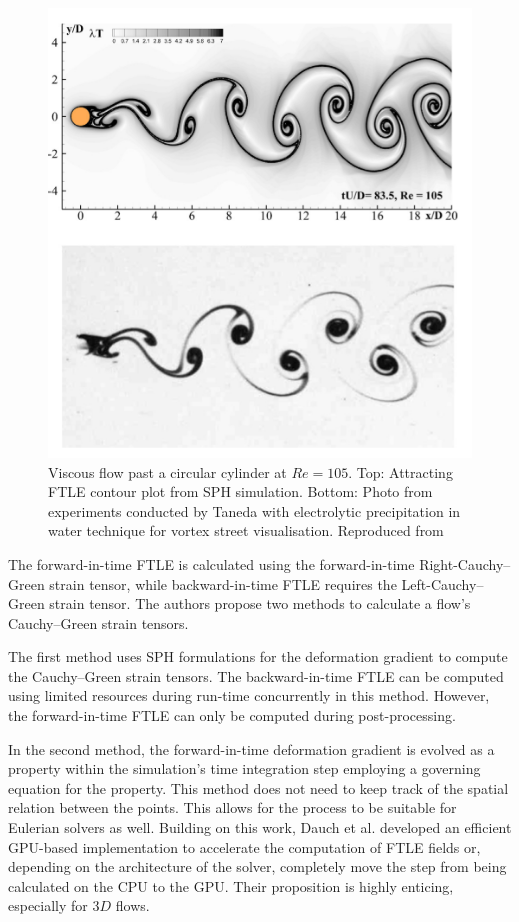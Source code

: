 \begin{figure}[h!]
    \centering
    \includegraphics{Figures/research_papers/sun2016detection-fig-1.png}
    \caption{Viscous flow past a circular cylinder at $Re = 105$. Top: Attracting FTLE contour plot from SPH simulation. Bottom: Photo from experiments conducted by Taneda \parencite{taneda1977visual} with electrolytic precipitation in water technique for vortex street visualisation. Reproduced from \cite{sun2016detection}}
    \label{fig:sun2016detection-fig-1}
\end{figure}

The forward-in-time FTLE is calculated using the forward-in-time Right-Cauchy–Green strain tensor, while backward-in-time FTLE requires the Left-Cauchy–Green strain tensor.
The authors propose two methods to calculate a flow's Cauchy–Green strain tensors.

The first method uses SPH formulations for the deformation gradient to compute the Cauchy–Green strain tensors. The backward-in-time FTLE can be computed using limited resources during run-time concurrently in this method. However, the forward-in-time FTLE can only be computed during post-processing.

In the second method, the forward-in-time deformation gradient is evolved as a property within the simulation's time integration step employing a governing equation for the property. This method does not need to keep track of the spatial relation between the points. This allows for the process to be suitable for Eulerian solvers as well.
Building on this work, Dauch et al. \parencite{dauch2018highly} developed an efficient GPU-based implementation to accelerate the computation of FTLE fields or, depending on the architecture of the solver, completely move the step from being calculated on the CPU to the GPU. Their proposition is highly enticing, especially for $3D$ flows.


